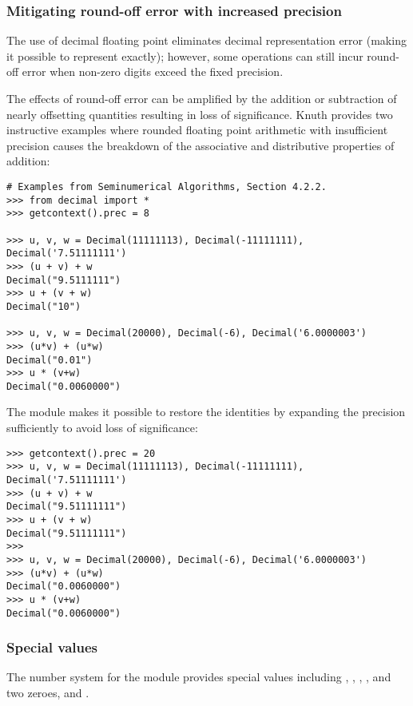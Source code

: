 \subsubsection{Mitigating round-off error with increased precision}

The use of decimal floating point eliminates decimal representation error
(making it possible to represent  exactly); however, some
operations can still incur round-off error when non-zero digits exceed the
fixed precision.

The effects of round-off error can be amplified by the addition or subtraction
of nearly offsetting quantities resulting in loss of significance.  Knuth
provides two instructive examples where rounded floating point arithmetic with
insufficient precision causes the breakdown of the associative and
distributive properties of addition:

\begin{verbatim}
# Examples from Seminumerical Algorithms, Section 4.2.2.
>>> from decimal import *
>>> getcontext().prec = 8

>>> u, v, w = Decimal(11111113), Decimal(-11111111), Decimal('7.51111111')
>>> (u + v) + w
Decimal("9.5111111")
>>> u + (v + w)
Decimal("10")

>>> u, v, w = Decimal(20000), Decimal(-6), Decimal('6.0000003')
>>> (u*v) + (u*w)
Decimal("0.01")
>>> u * (v+w)
Decimal("0.0060000")
\end{verbatim}

The  module makes it possible to restore the identities
by expanding the precision sufficiently to avoid loss of significance:

\begin{verbatim}
>>> getcontext().prec = 20
>>> u, v, w = Decimal(11111113), Decimal(-11111111), Decimal('7.51111111')
>>> (u + v) + w
Decimal("9.51111111")
>>> u + (v + w)
Decimal("9.51111111")
>>> 
>>> u, v, w = Decimal(20000), Decimal(-6), Decimal('6.0000003')
>>> (u*v) + (u*w)
Decimal("0.0060000")
>>> u * (v+w)
Decimal("0.0060000")
\end{verbatim}

\subsubsection{Special values}

The number system for the  module provides special
values including , , ,
, and two zeroes,  and .

